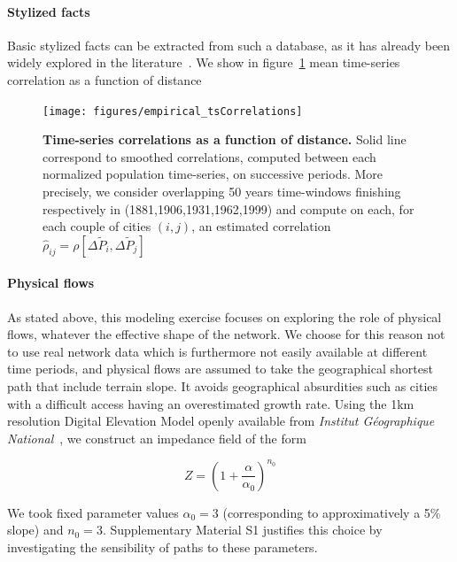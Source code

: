 \documentclass[Royal,sageh,times]{sagej}
\begin{document}
\paragraph{Stylized facts}

Basic stylized facts can be extracted from such a database, as it has already been widely explored in the literature~\cite{}. %
 We show in figure~\ref{fig:ts-correlations} mean time-series correlation as a function of distance




\begin{figure}
\centering
\texttt{[image: figures/empirical\_tsCorrelations]}
\caption{\textbf{Time-series correlations as a function of distance.} Solid line correspond to smoothed correlations, computed between each normalized population time-series, on successive periods. More precisely, we consider overlapping 50 years time-windows finishing respectively in (1881,1906,1931,1962,1999) and compute on each, for each couple of cities $(i,j)$, an estimated correlation $\hat{\rho}_{ij}=\rho\left[\Delta \tilde{P}_i, \Delta \tilde{P}_j\right]$}
\label{fig:ts-correlations}
\end{figure}


\paragraph{Physical flows}

As stated above, this modeling exercise focuses on exploring the role of physical flows, whatever the effective shape of the network. We choose for this reason not to use real network data which is furthermore not easily available at different time periods, and physical flows are assumed to take the geographical shortest path that include terrain slope. It avoids geographical absurdities such as cities with a difficult access having an overestimated growth rate. Using the 1km resolution Digital Elevation Model openly available from \emph{Institut Géographique National}~\cite{bdalti}, we construct an impedance field of the form

\[
Z = \left(1 + \frac{\alpha}{\alpha_0}\right)^{n_0}
\]

We took fixed parameter values $\alpha_0 = 3$ (corresponding to approximatively a 5\% slope) and $n_0 = 3$. Supplementary Material S1 justifies this choice by investigating the sensibility of paths to these parameters.

\end{document}
